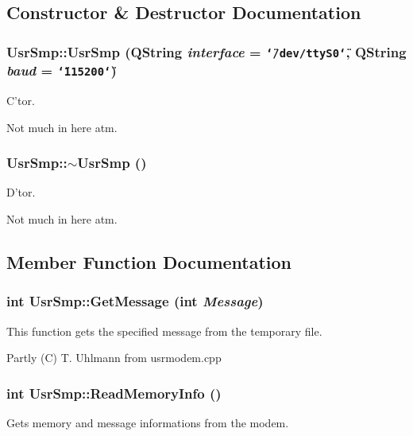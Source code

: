 \subsection{Constructor \& Destructor Documentation}
\subsubsection{\setlength{\rightskip}{0pt plus 5cm}Usr\-Smp::Usr\-Smp (QString {\em interface} = {\tt \char`\"{}/dev/ttyS0\char`\"{}}, QString {\em baud} = {\tt \char`\"{}115200\char`\"{}})}\label{classUsrSmp_a0}


C'tor. 

Not much in here atm. 
\subsubsection{\setlength{\rightskip}{0pt plus 5cm}Usr\-Smp::$\sim${\bf Usr\-Smp} ()}\label{classUsrSmp_a1}


D'tor. 

Not much in here atm. 

\subsection{Member Function Documentation}
\subsubsection{\setlength{\rightskip}{0pt plus 5cm}int Usr\-Smp::Get\-Message (int {\em Message})}\label{classUsrSmp_a11}


This function gets the specified message from the temporary file. 

Partly (C) T. Uhlmann from usrmodem.cpp 
\subsubsection{\setlength{\rightskip}{0pt plus 5cm}int Usr\-Smp::Read\-Memory\-Info ()}\label{classUsrSmp_a6}


Gets memory and message informations from the modem. 

